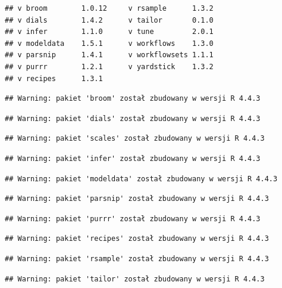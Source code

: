 \documentclass[
]{article}
\begin{document}
\begin{verbatim}
## v broom        1.0.12     v rsample      1.3.2 
## v dials        1.4.2      v tailor       0.1.0 
## v infer        1.1.0      v tune         2.0.1 
## v modeldata    1.5.1      v workflows    1.3.0 
## v parsnip      1.4.1      v workflowsets 1.1.1 
## v purrr        1.2.1      v yardstick    1.3.2 
## v recipes      1.3.1
\end{verbatim}

\begin{verbatim}
## Warning: pakiet 'broom' został zbudowany w wersji R 4.4.3
\end{verbatim}

\begin{verbatim}
## Warning: pakiet 'dials' został zbudowany w wersji R 4.4.3
\end{verbatim}

\begin{verbatim}
## Warning: pakiet 'scales' został zbudowany w wersji R 4.4.3
\end{verbatim}

\begin{verbatim}
## Warning: pakiet 'infer' został zbudowany w wersji R 4.4.3
\end{verbatim}

\begin{verbatim}
## Warning: pakiet 'modeldata' został zbudowany w wersji R 4.4.3
\end{verbatim}

\begin{verbatim}
## Warning: pakiet 'parsnip' został zbudowany w wersji R 4.4.3
\end{verbatim}

\begin{verbatim}
## Warning: pakiet 'purrr' został zbudowany w wersji R 4.4.3
\end{verbatim}

\begin{verbatim}
## Warning: pakiet 'recipes' został zbudowany w wersji R 4.4.3
\end{verbatim}

\begin{verbatim}
## Warning: pakiet 'rsample' został zbudowany w wersji R 4.4.3
\end{verbatim}

\begin{verbatim}
## Warning: pakiet 'tailor' został zbudowany w wersji R 4.4.3
\end{verbatim}
\end{document}
